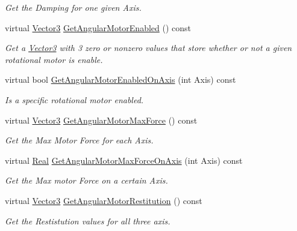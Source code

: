 \begin{DoxyCompactItemize}
\begin{DoxyCompactList}\small\item\em Get the Damping for one given Axis. \item\end{DoxyCompactList}\item 
virtual \hyperlink{classMezzanine_1_1Vector3}{Vector3} \hyperlink{classMezzanine_1_1Generic6DofConstraint_a5d69240a3ded30c0ef0312313667eccf}{GetAngularMotorEnabled} () const 
\begin{DoxyCompactList}\small\item\em Get a \hyperlink{classMezzanine_1_1Vector3}{Vector3} with 3 zero or nonzero values that store whether or not a given rotational motor is enable. \item\end{DoxyCompactList}\item 
virtual bool \hyperlink{classMezzanine_1_1Generic6DofConstraint_a1b23ad89fd57f5272e6c1dfa13957b14}{GetAngularMotorEnabledOnAxis} (int Axis) const 
\begin{DoxyCompactList}\small\item\em Is a specific rotational motor enabled. \item\end{DoxyCompactList}\item 
virtual \hyperlink{classMezzanine_1_1Vector3}{Vector3} \hyperlink{classMezzanine_1_1Generic6DofConstraint_a0ab2e7b20a8aa33c1cbffd77ec2e96a2}{GetAngularMotorMaxForce} () const 
\begin{DoxyCompactList}\small\item\em Get the Max Motor Force for each Axis. \item\end{DoxyCompactList}\item 
virtual \hyperlink{namespaceMezzanine_a726731b1a7df72bf3583e4a97282c6f6}{Real} \hyperlink{classMezzanine_1_1Generic6DofConstraint_a7610b33e8d29925d95cf9d3bf8921301}{GetAngularMotorMaxForceOnAxis} (int Axis) const 
\begin{DoxyCompactList}\small\item\em Get the Max motor Force on a certain Axis. \item\end{DoxyCompactList}\item 
virtual \hyperlink{classMezzanine_1_1Vector3}{Vector3} \hyperlink{classMezzanine_1_1Generic6DofConstraint_a87e8fd1a3fb1d959982f1f684182abbe}{GetAngularMotorRestitution} () const 
\begin{DoxyCompactList}\small\item\em Get the Restistution values for all three axis. \item\end{DoxyCompactList}\item 

\end{DoxyCompactItemize}
